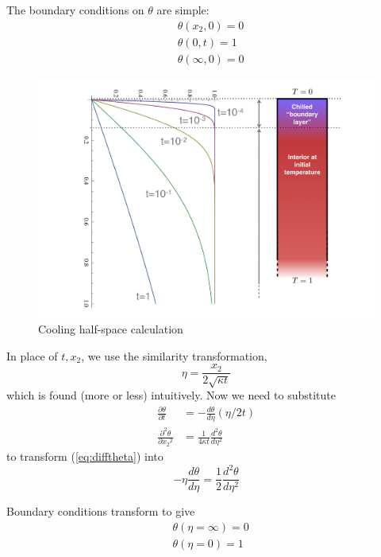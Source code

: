 \documentclass[10pt]{article}
\begin{document}
	The boundary conditions on $\theta$ are simple:
			\begin{align}
				& \theta(x_2,0) = 0	\\
				& \theta(0,t) = 1	\\
				& \theta(\infty,0) = 0		
			\end{align}
		\begin{figure}[h]
			\begin{center}
				\includegraphics[width=0.66\linewidth]{Diagrams/CoolingHalfSpaceSolutions1}
				\caption[]{Cooling half-space calculation}
			\end{center}	
		\end{figure}

	In place of $t,x_2$, we use the similarity transformation,
		\begin{equation}
			\eta = \frac{x_2}{2\sqrt{\kappa t}}
		\end{equation}
	which is found (more or less) intuitively. 
	Now we need to substitute
		\begin{align}
			\frac{\partial \theta}{\partial t} & = -\frac{d \theta}{d\eta}(\eta/2t)	\\
			\frac{\partial^2 \theta}{\partial {x_2}^2} & = \frac{1}{4\kappa t}\frac{d^2 \theta}{d \eta^2}
		\end{align}
	to transform (\ref{eq:difftheta}) into
		\begin{equation}
			-\eta \frac{d \theta}{d\eta} = \frac{1}{2} \frac{d^2 \theta}{d \eta^2}
			\label{eq:diffode}
		\end{equation}
		
	Boundary conditions transform to give	
			\begin{align}
				& \theta(\eta=\infty) = 0	\\
				& \theta(\eta=0) = 1	
			\end{align}
		
\end{document}
